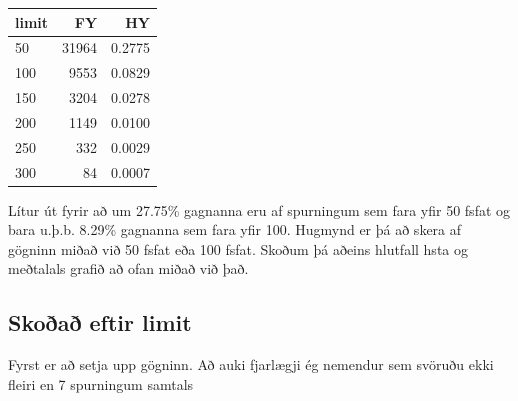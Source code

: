 \documentclass[
]{article}
\newenvironment{Shaded}{\begin{snugshade}}{\end{snugshade}}
\newcommand{\DataTypeTok}[1]{\textcolor[rgb]{0.13,0.29,0.53}{#1}}
\newcommand{\DecValTok}[1]{\textcolor[rgb]{0.00,0.00,0.81}{#1}}
\newcommand{\KeywordTok}[1]{\textcolor[rgb]{0.13,0.29,0.53}{\textbf{#1}}}
\newcommand{\NormalTok}[1]{#1}
\newcommand{\OperatorTok}[1]{\textcolor[rgb]{0.81,0.36,0.00}{\textbf{#1}}}
\newcommand{\StringTok}[1]{\textcolor[rgb]{0.31,0.60,0.02}{#1}}
\begin{document}
\begin{Shaded}
\begin{Highlighting}[]
{{{{{\NormalTok{FHbylim }\OperatorTok{%
\end{Highlighting}
\end{Shaded}

\begin{tabular}{l|r|r}
\hline
limit & FY & HY\\
\hline
50 & 31964 & 0.2775\\
\hline
100 & 9553 & 0.0829\\
\hline
150 & 3204 & 0.0278\\
\hline
200 & 1149 & 0.0100\\
\hline
250 & 332 & 0.0029\\
\hline
300 & 84 & 0.0007\\
\hline
\end{tabular}

Lítur út fyrir að um 27.75\% gagnanna eru af spurningum sem fara yfir 50 fsfat og bara u.þ.b. 8.29\% gagnanna sem fara yfir 100. Hugmynd er þá að skera af gögninn miðað við 50 fsfat eða 100 fsfat. Skoðum þá aðeins hlutfall hsta og meðtalals grafið að ofan miðað við það.

\hypertarget{skouxf0auxf0-eftir-limit}{%
\subsection{Skoðað eftir limit}\label{skouxf0auxf0-eftir-limit}}

Fyrst er að setja upp gögninn. Að auki fjarlægji ég nemendur sem svöruðu ekki fleiri en 7 spurningum samtals

\begin{Shaded}
\end{Shaded}
\end{document}
